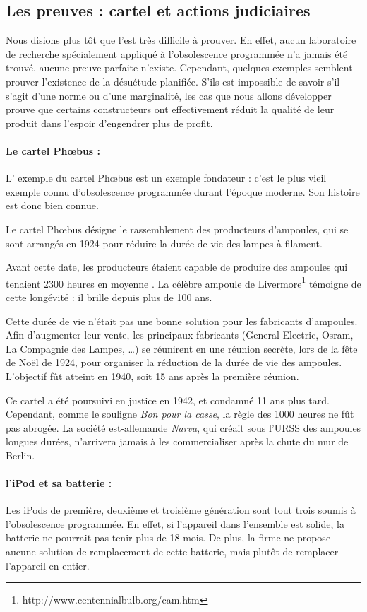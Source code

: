 \subsection{Les preuves : cartel et actions judiciaires}


Nous disions plus tôt que l'\op est très difficile à prouver. En effet, aucun laboratoire de recherche spécialement appliqué à l'obsolescence programmée n'a jamais été trouvé, aucune preuve parfaite n'existe. Cependant, quelques exemples semblent prouver l'existence de la désuétude planifiée. S'ils est impossible de savoir s'il s'agit d'une norme ou d'une marginalité, les cas que nous allons développer prouve que certains constructeurs ont effectivement réduit la qualité de leur produit dans l'espoir d'engendrer plus de profit. 

\paragraph*{Le cartel Phœbus : } L' exemple du cartel Phœbus est un exemple fondateur : c'est le plus vieil exemple connu d'obsolescence programmée durant l'époque moderne. Son histoire est donc bien connue. 

Le cartel Phœbus désigne le rassemblement des producteurs d'ampoules, qui se sont arrangés en 1924 pour réduire la durée de vie des lampes à filament. 

Avant cette date, les producteurs étaient capable de produire des ampoules qui tenaient 2300 heures en moyenne \cite{opes_PHOEBUS}. La célèbre ampoule de Livermore\footnote{http://www.centennialbulb.org/cam.htm} témoigne de cette longévité : il brille depuis plus de 100 ans. 

Cette durée de vie n'était pas une bonne solution pour les fabricants d'ampoules. Afin d'augmenter leur vente,  les principaux fabricants (General Electric, Osram, La Compagnie des Lampes, \dots) se réunirent en une réunion secrète, lors de la fête de Noël de 1924, pour organiser la  réduction de la durée de vie des ampoules. L'objectif fût atteint  en 1940, soit 15 ans après la première réunion. 

Ce cartel a été poursuivi en justice en 1942, et condamné 11 ans plus tard. Cependant, comme le souligne \textit{Bon pour la casse}, la règle des 1000 heures ne fût pas abrogée. La société est-allemande \textit{Narva}, qui créait sous l'URSS des ampoules longues durées, n'arrivera jamais à les commercialiser après la chute du mur de Berlin. 

\paragraph*{l'iPod et sa batterie : } Les iPods de première, deuxième et troisième génération sont tout trois soumis à l'obsolescence programmée. En effet, si l'appareil dans l'ensemble est solide, la batterie ne pourrait pas tenir plus de 18 mois\cite{cec-zevRapportObsProg}. De plus, la firme ne propose aucune solution de remplacement de cette batterie, mais plutôt de remplacer l'appareil en entier. 

